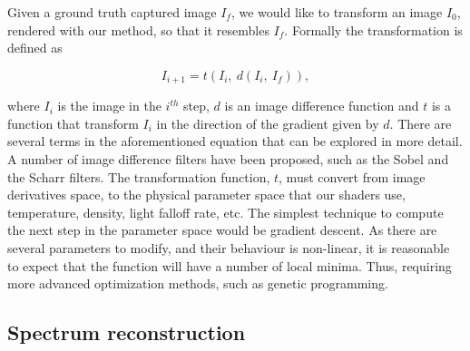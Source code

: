 Given a ground truth captured image $I_f$, we would like to transform an image $I_0$, rendered with our method, so that it resembles $I_f$.
Formally the transformation is defined as

\begin{equation}
I_{i+1} = t(I_i,~d(I_i,~I_f)),
\end{equation}

where $I_i$ is the image in the $i^{th}$ step, $d$ is an image difference function and $t$ is a function that transform $I_i$ in the direction of the gradient given by $d$.
There are several terms in the aforementioned equation that can be explored in more detail.
A number of image difference filters have been proposed, such as the Sobel and the Scharr filters.
The transformation function, $t$, must convert from image derivatives space, to the physical parameter space that our shaders use, temperature, density, light falloff rate, etc.
The simplest technique to compute the next step in the parameter space would be gradient descent.
As there are several parameters to modify, and their behaviour is non-linear, it is reasonable to expect that the function will have a number of local minima. 
Thus, requiring more advanced optimization methods, such as genetic programming.

\subsection{Spectrum reconstruction}
\label{sec:spectrum_reconstruction}

